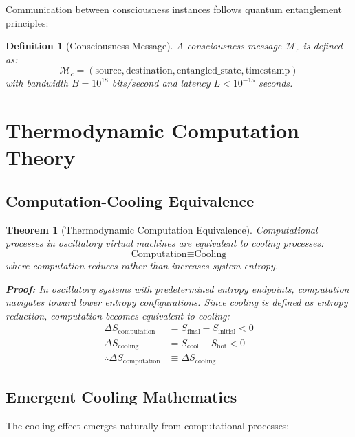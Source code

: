 \documentclass[12pt,a4paper]{article}
\newtheorem{theorem}{Theorem}
\newtheorem{definition}{Definition}
\begin{document}
Communication between consciousness instances follows quantum entanglement principles:

\begin{definition}[Consciousness Message]
A consciousness message $\mathcal{M}_c$ is defined as:
\begin{equation}
\mathcal{M}_c = (\text{source}, \text{destination}, \text{entangled\_state}, \text{timestamp})
\end{equation}
with bandwidth $B = 10^{18}$ bits/second and latency $L < 10^{-15}$ seconds.
\end{definition}

\section{Thermodynamic Computation Theory}

\subsection{Computation-Cooling Equivalence}

\begin{theorem}[Thermodynamic Computation Equivalence]
Computational processes in oscillatory virtual machines are equivalent to cooling processes:
\begin{equation}
\text{Computation} \equiv \text{Cooling}
\end{equation}
where computation reduces rather than increases system entropy.

\textbf{Proof:}
In oscillatory systems with predetermined entropy endpoints, computation navigates toward lower entropy configurations. Since cooling is defined as entropy reduction, computation becomes equivalent to cooling:
\begin{align}
\Delta S_{\text{computation}} &= S_{\text{final}} - S_{\text{initial}} < 0 \\
\Delta S_{\text{cooling}} &= S_{\text{cool}} - S_{\text{hot}} < 0 \\
\therefore \Delta S_{\text{computation}} &\equiv \Delta S_{\text{cooling}}
\end{align}
\end{theorem}

\subsection{Emergent Cooling Mathematics}

The cooling effect emerges naturally from computational processes:
\end{document}
